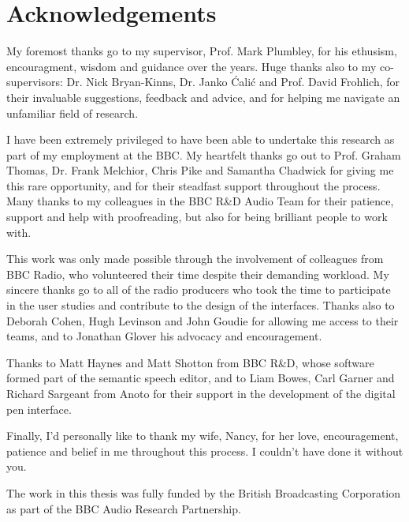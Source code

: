 \chapter*{Acknowledgements}

My foremost thanks go to my supervisor, Prof. Mark Plumbley, for his ethusism, encouragment, wisdom and guidance over
the years. Huge thanks also to my co-supervisors: Dr. Nick Bryan-Kinns, Dr. Janko \'{C}ali\'{c} and Prof.  David
Frohlich, for their invaluable suggestions, feedback and advice, and for helping me navigate an unfamiliar field of
research.

I have been extremely privileged to have been able to undertake this research as part of my employment at the BBC.  My
heartfelt thanks go out to Prof. Graham Thomas, Dr. Frank Melchior, Chris Pike and Samantha Chadwick for giving me this
rare opportunity, and for their steadfast support throughout the process.  Many thanks to my colleagues in the BBC R\&D
Audio Team for their patience, support and help with proofreading, but also for being brilliant people to work with.

This work was only made possible through the involvement of colleagues from BBC Radio, who volunteered their time
despite their demanding workload. My sincere thanks go to all of the radio producers who took the time to participate
in the user studies and contribute to the design of the interfaces. Thanks also to Deborah Cohen, Hugh Levinson and
John Goudie for allowing me access to their teams, and to Jonathan Glover his advocacy and encouragement.

Thanks to Matt Haynes and Matt Shotton from BBC R\&D, whose software formed part of the semantic speech editor, and to
Liam Bowes, Carl Garner and Richard Sargeant from Anoto for their support in the development of the digital pen
interface. 

Finally, I'd personally like to thank my wife, Nancy, for her love, encouragement, patience and belief in me throughout
this process. I couldn't have done it without you.

\vfill
\noindent
The work in this thesis was fully funded by the British Broadcasting Corporation as part of the BBC Audio Research
Partnership.
